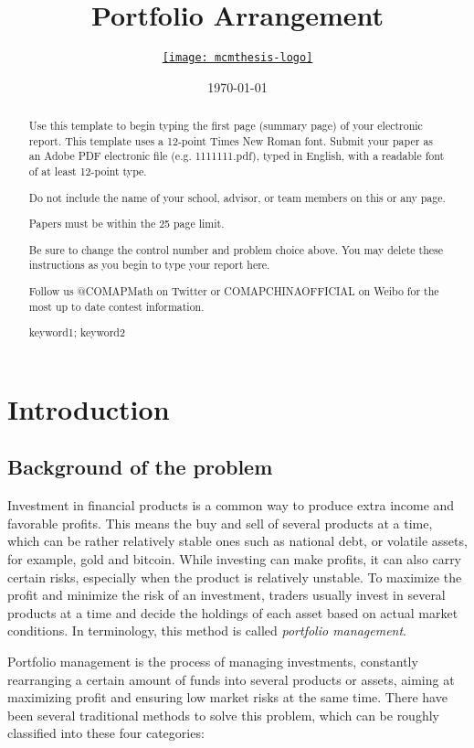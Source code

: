 \documentclass{mcmthesis}
\title{Portfolio Arrangement}
\author{\small \href{https://www.latexstudio.net/}
  {\texttt{[image: mcmthesis-logo]}}}
\date{\today}
\begin{document}
\begin{abstract}
Use this template to begin typing the first page (summary page) of your electronic report. This template uses a 12-point Times New Roman font. Submit your paper as an Adobe PDF electronic file (e.g. 1111111.pdf), typed in English, with a readable font of at least 12-point type.

Do not include the name of your school, advisor, or team members on this or any page.

Papers must be within the 25 page limit.

Be sure to change the control number and problem choice above.
You may delete these instructions as you begin to type your report here.

Follow us @COMAPMath on Twitter or COMAPCHINAOFFICIAL on Weibo for the most up to date contest information.

\begin{keywords}
keyword1; keyword2
\end{keywords}
\end{abstract}
\maketitle

\tableofcontents
\newpage

\section{Introduction}
\subsection{Background of the problem}

 Investment in financial products is a common way to produce extra income and favorable profits.
This means the buy and sell of several products at a time,
which can be rather relatively stable ones such as national debt,
or volatile assets, for example, gold and bitcoin.
While investing can make profits, it can also carry certain risks,
especially when the product is relatively unstable.
To maximize the profit and minimize the risk of an investment,
traders usually invest in several products at a time
and decide the holdings of each asset based on actual market conditions.
In terminology, this method is called \textit{portfolio management}.

Portfolio management is the process of managing investments,
constantly rearranging a certain amount of funds into several products or assets,
aiming at maximizing profit and ensuring low market risks at the same time.
There have been several traditional methods to solve this problem,
which can be roughly classified into these four categories\cite{li2014online}:
\end{document}
